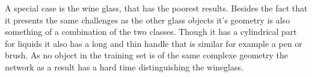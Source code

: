 A special case is the wine glass, that has the poorest results. Besides the fact that it presents the same challenges as the other glass objects it's geometry is also something of a combination of the two classes. Though it has a cylindrical part for liquids it also has a long and thin handle that is similar for example a pen or brush. As no object in the training set is of the same complexe geometry the network as a result has a hard time distinguishing the wineglass.
